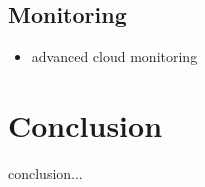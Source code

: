 \documentclass[conference]{IEEEtran}
\begin{document}
\subsection{Monitoring}
\begin{itemize}
	\item advanced cloud monitoring
\end{itemize}

\section{Conclusion}
\label{sec:conclusion}
conclusion...




\end{document}

